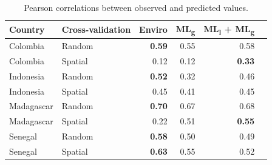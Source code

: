 \documentclass[review]{elsarticle}
\begin{document}






\begin{table}[t!]
\caption{Pearson correlations between observed and predicted values. }
\centering
\begin{tabular}{llrrrr}
Country &  Cross-validation & Enviro &   ML\textsubscript{g} & ML\textsubscript{l} + ML\textsubscript{g} \\
\hline 
 Colombia & Random &  \textbf{0.59} &0.55 & 0.58 \\
 Colombia &  Spatial &  0.12 &  0.12 & \textbf{0.33}\\
 Indonesia &  Random &  \textbf{0.52} & 0.32 & 0.46 \\
 Indonesia &  Spatial &  0.45 & 0.41 & 0.45 \\
 Madagascar &  Random &  \textbf{0.70} &  0.67 & 0.68 \\
 Madagascar &  Spatial &  0.22 &  0.51 & \textbf{0.55}\\
 Senegal &  Random &  \textbf{0.58} &  0.50 & 0.49 \\
 Senegal &  Spatial &   \textbf{0.63} & 0.55 & 0.52 \\

\end{tabular}
\label{t:results2}
\end{table}
\end{document}
